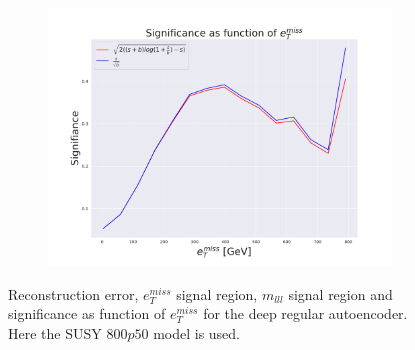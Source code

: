\begin{figure}[H]
    \begin{subfigure}{.60\textwidth}
        \includegraphics[width=\textwidth]{Figures/AE_testing/big/2lep/significance_etmiss_800p0p050_-1.4833711230716062.pdf}
        \caption{}
        \label{fig:AE_2lep_big_signi_800}
    \end{subfigure}
    \hfill      
    \caption[2lep deep network | $800p50$ | AE]{Reconstruction error, $e_T^{miss}$ signal region, $m_{lll}$ signal region and significance as function of 
    $e_T^{miss}$ for the deep regular autoencoder. Here the SUSY $800p50$ model is used.}
    \label{fig:AE_2lep_big_rec_sig_signi_800}
\end{figure}

